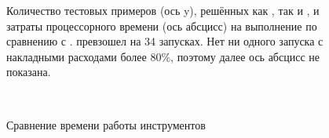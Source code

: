 \begin{figure}
    \pgfmathsetmacro\NRows{\pgfplotsretval}
        \centering

    \caption{Количество тестовых примеров (ось y), решённых как \theringenCICI{}, так и \racer{}, и затраты процессорного времени (ось абсцисс) на выполнение \theringenCICI{} по сравнению с \racer{}. \racer{} превзошел \theringenCICI{} на 34 запусках. Нет ни одного запуска с накладными расходами более 80\%, поэтому далее ось абсцисс не показана.}
    \label{fig:performance}
\end{figure}

\begin{figure}
~
\caption{Сравнение времени работы инструментов}
\label{fig:toolplot}
\end{figure}

